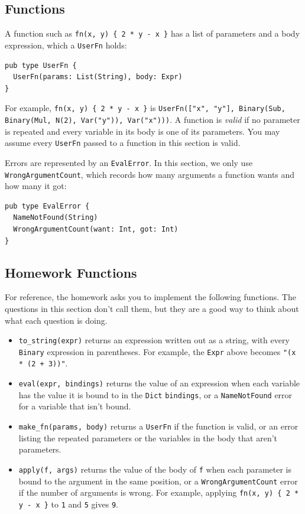 \subsection*{Functions}

A function such as \lstinline|fn(x, y) { 2 * y - x }| has a list of parameters and a body expression, which a \lstinline{UserFn} holds:
\begin{lstlisting}
pub type UserFn {
  UserFn(params: List(String), body: Expr)
}
\end{lstlisting}
For example, \lstinline|fn(x, y) { 2 * y - x }| is \lstinline{UserFn(["x", "y"], Binary(Sub, Binary(Mul, N(2), Var("y")), Var("x")))}. A function is \emph{valid} if no parameter is repeated and every variable in its body is one of its parameters. You may assume every \lstinline{UserFn} passed to a function in this section is valid.

Errors are represented by an \lstinline{EvalError}. In this section, we only use \lstinline{WrongArgumentCount}, which records how many arguments a function wants and how many it got:
\begin{lstlisting}
pub type EvalError {
  NameNotFound(String)
  WrongArgumentCount(want: Int, got: Int)
}
\end{lstlisting}

\subsection*{Homework Functions}

For reference, the homework asks you to implement the following functions. The questions in this section don't call them, but they are a good way to think about what each question is doing.
\begin{itemize}
  \item \lstinline{to_string(expr)} returns an expression written out as a string, with every \lstinline{Binary} expression in parentheses. For example, the \lstinline{Expr} above becomes \lstinline{"(x * (2 + 3))"}.
  \item \lstinline{eval(expr, bindings)} returns the value of an expression when each variable has the value it is bound to in the \lstinline{Dict} \texttt{bindings}, or a \lstinline{NameNotFound} error for a variable that isn't bound.
  \item \lstinline{make_fn(params, body)} returns a \lstinline{UserFn} if the function is valid, or an error listing the repeated parameters or the variables in the body that aren't parameters.
  \item \lstinline{apply(f, args)} returns the value of the body of \texttt{f} when each parameter is bound to the argument in the same position, or a \lstinline{WrongArgumentCount} error if the number of arguments is wrong. For example, applying \lstinline|fn(x, y) { 2 * y - x }| to \texttt{1} and \texttt{5} gives \texttt{9}.
\end{itemize}
